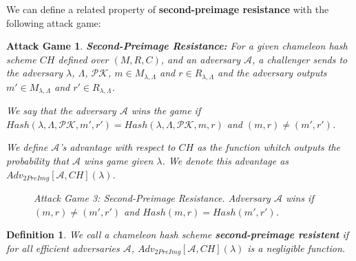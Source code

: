 \documentclass[a4paper]{article}
\newtheorem{definicao}{Definition}
\newtheorem{game}{Attack Game}
\begin{document}
 We can define a related property of \textbf{second-preimage
 resistance} with the following attack game:
 
 \begin{game}
 \textbf{Second-Preimage Resistance: }For a given chameleon hash scheme
 $CH$ defined over $(M, R, C)$, and an adversary $\mathcal{A}$,
 a challenger sends to the adversary $\lambda$, $\Lambda$,
 $\mathcal{PK}$, $m \in M_{\lambda,\Lambda}$ and 
 $r \in R_{\lambda,\Lambda}$ and the adversary
 outputs $m' \in M_{\lambda,\Lambda}$ and $r' \in R_{\lambda,\Lambda}$.
 
 We say that the adversary $\mathcal{A}$ wins the game if
 $Hash(\lambda, \Lambda, \mathcal{PK}, m', r') = 
 Hash(\lambda, \Lambda, \mathcal{PK}, m, r)$ and $(m, r) \neq (m', r')$.
 
 We define $\mathcal{A}$'s advantage with respect to $CH$ as the
 function whitch outputs the probability that $\mathcal{A}$ wins 
 game given $\lambda$. We denote this advantage as
 $Adv_{2PreImg}[\mathcal{A},CH](\lambda)$.
 
 \begin{figure}
 \centering
 \caption{Attack Game 3: Second-Preimage Resistance. Adversary $\mathcal{A}$ wins if $(m, r)\neq(m', r')$ and $Hash(m, r)=Hash(m', r')$.}
 \end{figure}
 \end{game}
 
 \begin{definicao}
 We call a chameleon hash scheme \textbf{second-preimage resistent} 
 if for all efficient adversaries $\mathcal{A}$,
 $Adv_{2PreImg}[\mathcal{A},CH](\lambda)$ is a negligible
 function.
 \end{definicao}
 
\end{document}
